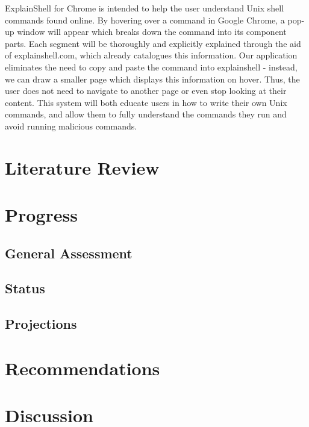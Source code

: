 \documentclass[11pt]{article}
\begin{document}
ExplainShell for Chrome is intended to help the user understand Unix shell
commands found online. By hovering over a command in Google Chrome, a pop-up
window will appear which breaks down the command into its component parts. Each
segment will be thoroughly and explicitly explained through the aid of
explainshell.com, which already catalogues this information. Our application
eliminates the need to copy and paste the command into explainshell - instead,
we can draw a smaller page which displays this information on hover. Thus, the
user does not need to navigate to another page or even stop looking at their
content. This system will both educate users in how to write their own Unix
commands, and allow them to fully understand the commands they run and avoid
running malicious commands.

\section{Literature Review}

\section{Progress}

\subsection{General Assessment}
\subsection{Status}
\subsection{Projections}

\section{Recommendations}

\section{Discussion}
\end{document}
